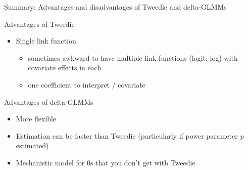 \documentclass[ignorenonframetext,]{beamer}
\providecommand{\tightlist}{%
  \setlength{\itemsep}{0pt}\setlength{\parskip}{0pt}}
\begin{document}
\begin{frame}{Summary: Advantages and disadvantages of Tweedie and
delta-GLMMs}

Advantages of Tweedie

\begin{itemize}
\tightlist
\item
  Single link function

  \begin{itemize}
  \tightlist
  \item
    sometimes awkward to have multiple link functions (logit, log) with
    covariate effects in each
  \item
    one coefficient to interpret / covariate
  \end{itemize}
\end{itemize}

Advantages of delta-GLMMs

\begin{itemize}
\tightlist
\item
  More flexible
\item
  Estimation can be faster than Tweedie (particularly if power parameter
  \emph{p} estimated)
\item
  Mechanistic model for 0s that you don't get with Tweedie
\end{itemize}

\end{frame}
\end{document}
